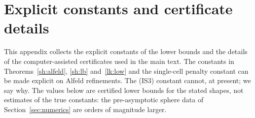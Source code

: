 \section{Explicit constants and certificate details}\label{sec:constants}\label{app:constants}

This appendix collects the explicit constants of the lower bounds and the details of the computer-assisted certificates used in the main text. The constants in Theorems~\ref{sh:alfeld}, \ref{sh:lb} and~\ref{lk:low} and the single-cell penalty constant can be made explicit on Alfeld refinements. The (IS3) constant cannot, at present; we say why. The values below are certified lower bounds for the stated shapes, not estimates of the true constants: the pre-asymptotic sphere data of Section~\ref{sec:numerics} are orders of magnitude larger.

